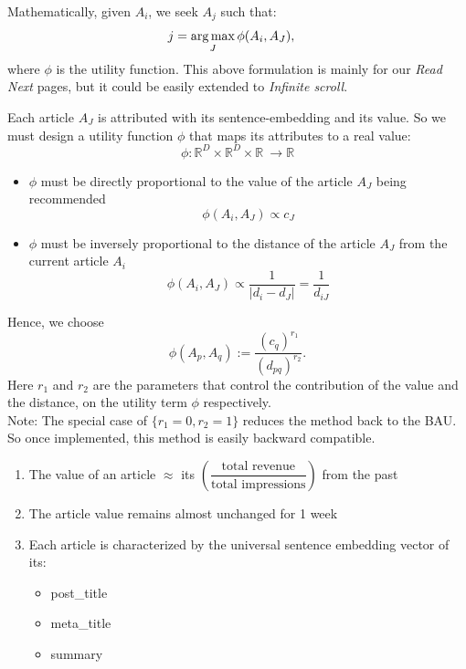 \documentclass[11]{article}
\begin{document}
Mathematically, given $A_i$, we seek $A_j$ such that:
\begin{align*}
 j&= \operatorname*{arg\,max}_J   \phi(A_i, A_{J}) ,
\end{align*}
where $\phi$ is the utility function. This above formulation is mainly for our \textit{Read Next} pages, but it could be easily extended to \textit{Infinite scroll}.


Each article $A_J$ is attributed with its sentence-embedding and its value. So we must design a utility function $\phi$ that maps its attributes to a real value:
\[ \phi: \mathbb{R}^D\times\mathbb{R}^D\times\mathbb{R}\ \to \mathbb{R} \]

\begin{itemize}
\item $\phi$ must be directly proportional to the  value of the article $A_J$ being recommended \[ \phi(A_i, A_{J})  \propto c_J \]
\item $\phi$ must be inversely proportional to the  distance of the article $A_J$ from the current article $A_i$ \[ \phi(A_i, A_{J})  \propto \frac{1}{|d_i-d_J|} =\frac{1}{d_{iJ}} \]
\end{itemize}

Hence, we choose $$\phi(A_p, A_{q}):=\dfrac{(c_{q})^{r_1}}{(d_{pq})^{r_2}}.$$ Here $r_1$ and $r_2$ are the parameters that control the contribution of the value and the distance, on the utility term $\phi$ respectively. \\Note: The special case of $\{r_1=0, r_2=1 \}$ reduces the method back to the BAU. So once implemented, this method is easily backward compatible.
\vspace{0.3cm}

\begin{enumerate}
\item The value of an article $\approx$ its $\left(\dfrac{\text{total revenue}}{\text{total impressions}} \right)$  from the past
\item The article value remains almost unchanged for 1 week
\item Each article is characterized by the universal sentence embedding vector of its: 
\begin{itemize}
\item post\_title
\item meta\_title
\item summary
\end{itemize}


\end{enumerate}
\end{document}
